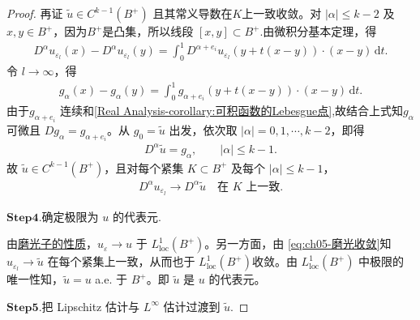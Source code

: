 \documentclass[../../main.tex]{subfiles}
\begin{document}
\begin{proof}
再证 $\widetilde{u}\in C^{k-1}(B^{+})$ 且其常义导数在$K$上一致收敛。对 $|\alpha|\leqslant k-2$ 及 $x,y\in B^{+}$，因为$B^+$是凸集，所以线段 $[x,y]\subset B^{+}$.由微积分基本定理，得
\begin{align*}
D^{\alpha}u_{\varepsilon_l}(x)-D^{\alpha}u_{\varepsilon_l}(y)
=\int_{0}^{1}D^{\alpha+e_i}u_{\varepsilon_l}(y+t(x-y))\cdot(x-y)\,\mathrm{d}t.
\end{align*}
令 $l\to\infty$，得
\begin{align}
g_{\alpha}(x)-g_{\alpha}(y)
=\int_{0}^{1}g_{\alpha+e_i}(y+t(x-y))\cdot(x-y)\,\mathrm{d}t.
\label{eq:ch05-导数极限}
\end{align}
由于$g_{\alpha+e_i}$ 连续和\cref{Real Analysis-corollary:可积函数的Lebesgue点},故结合上式知$g_{\alpha}$ 可微且 $Dg_{\alpha}=g_{\alpha+e_i}$。从 $g_0=\widetilde{u}$ 出发，依次取 $|\alpha|=0,1,\cdots,k-2$，即得
\begin{align*}
D^{\alpha}\widetilde{u}=g_{\alpha},\qquad |\alpha|\leqslant k-1.
\end{align*}
故 $\widetilde{u}\in C^{k-1}(B^{+})$，且对每个紧集 $K\subset B^{+}$ 及每个 $|\alpha|\leqslant k-1$，
\begin{align}
D^{\alpha}u_{\varepsilon_l}\longrightarrow D^{\alpha}\widetilde{u}
\quad\text{在 }K\text{ 上一致}.
\label{eq:ch05-磨光收敛}
\end{align}

\noindent$\mathbf{Step}\bm{4}$.{\heiti 确定极限为 $u$ 的代表元.}

由\hyperref[theorem:appC-光滑算子的性质]{磨光子的性质}，$u_{\varepsilon}\to u$ 于 $L^{1}_{\mathrm{loc}}(B^{+})$。另一方面，由 \eqref{eq:ch05-磨光收敛}知$u_{\varepsilon_l}\to\widetilde{u}$ 在每个紧集上一致，从而也于 $L^{1}_{\mathrm{loc}}(B^{+})$收敛。由 $L^{1}_{\mathrm{loc}}(B^{+})$ 中极限的唯一性知，$\widetilde{u}=u$ a.e. 于 $B^{+}$。即 $\widetilde{u}$ 是 $u$ 的代表元。

\noindent$\mathbf{Step}\bm{5}$.{\heiti 把 Lipschitz 估计与 $L^{\infty}$ 估计过渡到 $\widetilde{u}$.}


\end{proof}
\end{document}
